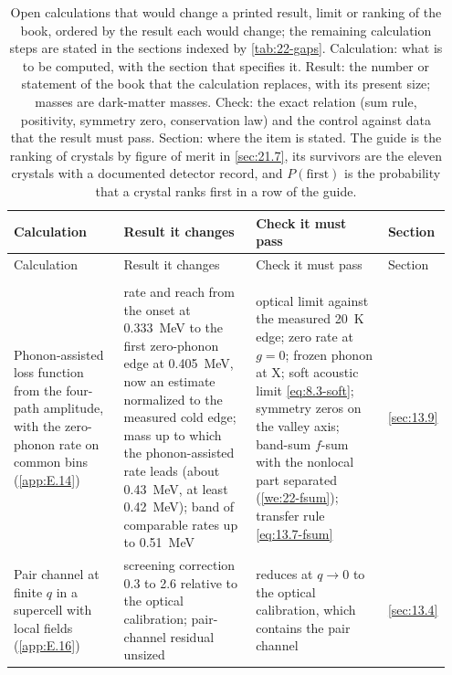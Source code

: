{\scriptsize\setlength{\tabcolsep}{3pt}\setlength{\LTcapwidth}{\linewidth}
\begin{longtable}{@{}>{\raggedright\arraybackslash}p{0.25\linewidth}>{\raggedright\arraybackslash}p{0.305\linewidth}>{\raggedright\arraybackslash}p{0.305\linewidth}>{\raggedright\arraybackslash}p{0.09\linewidth}@{}}
  \caption{Open calculations that would change a printed result, limit or ranking of the book, ordered by the result each would change; the remaining calculation steps are stated in the sections indexed by \cref{tab:22-gaps}. Calculation: what is to be computed, with the section that specifies it. Result: the number or statement of the book that the calculation replaces, with its present size; masses are dark-matter masses. Check: the exact relation (sum rule, positivity, symmetry zero, conservation law) and the control against data that the result must pass. Section: where the item is stated. The guide is the ranking of crystals by figure of merit in \cref{sec:21.7}, its survivors are the eleven crystals with a documented detector record, and $P(\mathrm{first})$ is the probability that a crystal ranks first in a row of the guide.}
  \label{tab:22-calc}\\
  \toprule
  Calculation & Result it changes & Check it must pass & Section \\
  \midrule
  \endfirsthead
  \toprule
  Calculation & Result it changes & Check it must pass & Section \\
  \midrule
  \endhead
  \bottomrule
  \endfoot
  \multicolumn{4}{@{}l}{\emph{Silicon electron recoil}} \\
  Phonon-assisted loss function from the four-path amplitude, with the zero-phonon rate on common bins (\cref{app:E.14}) & rate and reach from the onset at \SI{0.333}{MeV} to the first zero-phonon edge at \SI{0.405}{MeV}, now an estimate normalized to the measured cold edge; mass up to which the phonon-assisted rate leads (about \SI{0.43}{MeV}, at least \SI{0.42}{MeV}); band of comparable rates up to \SI{0.51}{MeV} & optical limit against the measured \SI{20}{K} edge; zero rate at $g = 0$; frozen phonon at X; soft acoustic limit \cref{eq:8.3-soft}; symmetry zeros on the valley axis; band-sum $f$-sum with the nonlocal part separated (\cref{we:22-fsum}); transfer rule \cref{eq:13.7-fsum} & \cref{sec:13.9} \\
  Pair channel at finite $q$ in a supercell with local fields (\cref{app:E.16}) & screening correction 0.3 to 2.6 relative to the optical calibration; pair-channel residual unsized & reduces at $q \to 0$ to the optical calibration, which contains the pair channel & \cref{sec:13.4} \\

\end{longtable}}
